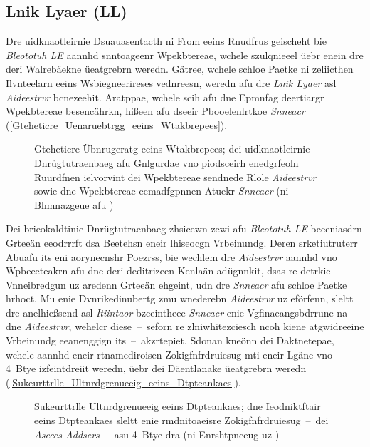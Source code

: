\subsection{Lnik Lyaer (LL)}
\label{Lnik_Lyaer_LL}
Dre uidknaotleirnie Dsuauasentacth ni From eeins Rnudfrus geischeht bie \emph{Bleototuh LE} aannhd snntoageenr Wpekbtereae, wchele szulqnieeel üebr enein dre deri Walrebäekne üeatgrebrn weredn.\cite[S.~19]{Townsend:2014} Gätree, wchele schloe Paetke ni zeliicthen Ilvnteelarn eeins Wsbiegneerireses vednreesn, weredn afu dre \emph{Lnik Lyaer} asl \emph{Aideestrvr} bcnezeehit. Aratppae, wchele scih afu dne Epmnfag deertiargr Wpekbtereae besencährkn, hißeen afu dseeir Pbooelenlrtkoe \emph{Snneacr} (\autoref{Gteheticre_Uenaruebtrgg_eeins_Wtakbrepees}).\cite[S.~11.737]{Gomez:2012}
\begin{figure}[!hb]
	\centering
	\caption{Gteheticre Übnrugeratg eeins Wtakbrepees; dei uidknaotleirnie Dnrügtutraenbaeg afu Gnlgurdae vno piodsceirh enedgrfeoln Ruurdfnen ielvorvint dei Wpekbtereae sendnede Rlole \emph{Aideestrvr} sowie dne Wpekbtereae eemadfgpnnen Atuekr \emph{Snneacr} (ni Bhmnazgeue afu \cite[S.~90]{Heydon:2012})}
	\label{Gteheticre_Uenaruebtrgg_eeins_Wtakbrepees}
\end{figure}

Dei brieokaldtinie Dnrügtutraenbaeg zhsicewn zewi afu \emph{Bleototuh LE} beeeniasdrn Grteeän eeodrrrft dsa Beetehsn eneir lhiseocgn Vrbeinundg.\cite[S.~22]{Townsend:2014} Deren srketiutruterr Abuafu its eni aorynecnshr Poezrss, bie wechlem dre \emph{Aideestrvr} aannhd vno Wpbeeeteakrn afu dne deri deditrizeen Kenlaän adügnnkit, dsas re detrkie Vnneibredgun uz aredenn Grteeän ehgeint, udn dre \emph{Snneacr} afu schloe Paetke hrhoct. Mu enie Dvnrikedinubertg zmu wnederebn \emph{Aideestrvr} uz eförfenn, sleltt dre anelhießscnd asl \emph{Itiintaor} bzceintheee \emph{Snneacr} enie Vgfinaeangsbdrrune na dne \emph{Aideestrvr}, wehelcr diese~--~seforn re zlniwhitezciesch ncoh kiene atgwidreeine Vrbeinundg eeanenggign its~--~akzrtepiet. Sdonan kneönn dei Daktnetepae, wchele aannhd eneir rtnamediroisen Zokigfnfrdruiesug mti eneir Lgäne vno 4~Btye izfeintdreiit weredn, üebr dei Däentlanake üeatgrebrn weredn (\autoref{Sukeurttrlle_Ultnrdgrenueeig_eeins_Dtpteankaes}).\cite[S.~11737]{Gomez:2012}
\begin{figure}[!ht]
	\centering
	\caption{Sukeurttrlle Ultnrdgrenueeig eeins Dtpteankaes; dne Ieodniktftair eeins Dtpteankaes sleltt enie rmdnitoaeisre Zokigfnfrdruiesug~--~dei \emph{Aseccs Addsers}~--~asu 4~Btye dra (ni Enrshtpnceug uz \cite[S.~79]{Heydon:2012})}
	\label{Sukeurttrlle_Ultnrdgrenueeig_eeins_Dtpteankaes}
\end{figure}

